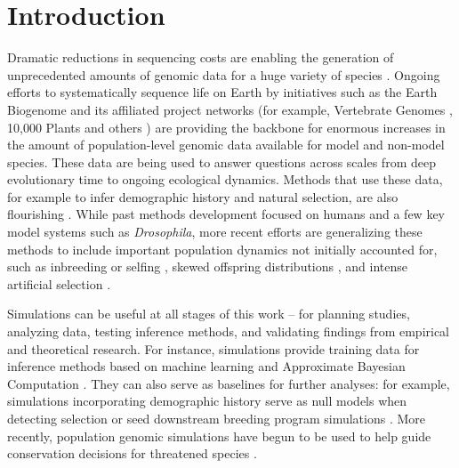 \documentclass[hidelinks]{article}
\begin{document}
\section*{Introduction}
    \label{introduction}

Dramatic reductions in sequencing costs are enabling the generation of
unprecedented amounts of genomic data for a huge variety of species
\citep{Ellegren2014}. Ongoing efforts to systematically sequence life on
Earth by initiatives such as the Earth Biogenome \citep{Lewin2022} and its
affiliated project networks (for example, Vertebrate Genomes
\citep{Rhie2021}, 10,000 Plants \citep{Cheng2018} and others \citep{darwin2022sequence}) are
providing the backbone for enormous increases in the amount of population-level genomic data
available for model and non-model species.
These data are being used to answer questions across scales
from deep evolutionary time to ongoing ecological dynamics.
Methods that use these data, for example to infer demographic history and natural selection,
are also flourishing \citep{Beichman2018}.
While past methods development focused on humans and a few key model systems such as \emph{Drosophila},
more recent efforts are generalizing these methods to include 
important population dynamics not initially accounted for,
such as inbreeding or selfing \citep{Blischak2020}, skewed offspring
distributions \citep{Montano2016}, and intense artificial selection \citep{MacLeod2013, MacLeod2014}.

Simulations can be useful at all stages of this work --
for planning studies, analyzing data, testing inference methods,
and validating findings from empirical and theoretical research.
For instance, simulations provide training data
for inference methods based on machine learning \citep{Schrider2018} and
Approximate Bayesian Computation \citep{Csillery2010}. They can also serve as
baselines for further analyses: for example, simulations incorporating
demographic history serve as null models when detecting selection \citep{Hsieh2016a}
or seed downstream breeding program simulations \citep{Gaynor2020}.
More recently, population genomic simulations have begun
to be used to help guide conservation decisions for threatened species
\citep{Teixeira2021,kyriazis2022using}.
\end{document}
